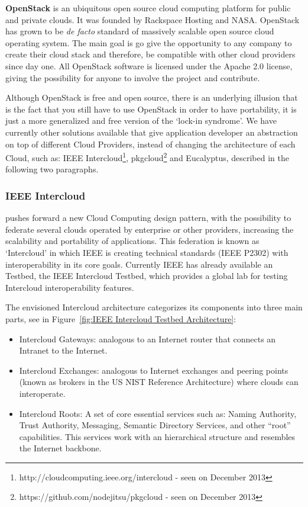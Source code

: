 \textbf{OpenStack} is an ubiquitous open source cloud computing platform for public and private clouds. It was founded by Rackspace Hosting and NASA. OpenStack has grown to be \textit{de facto} standard of massively scalable open source cloud operating system. The main goal is go give the opportunity to any company to create their cloud stack and therefore, be compatible with other cloud providers since day one. All OpenStack software is licensed under the Apache 2.0 license, giving the possibility for anyone to involve the project and contribute. 

Although OpenStack is free and open source, there is an underlying illusion that is the fact that you still have to use OpenStack in order to have portability, it is just a more generalized and free version of the `lock-in syndrome'. We have currently other solutions available that give application developer an abstraction on top of different Cloud Providers, instead of changing the architecture of each Cloud, such as: IEEE Intercloud\footnote{http://cloudcomputing.ieee.org/intercloud - seen on December 2013}, pkgcloud\footnote{https://github.com/nodejitsu/pkgcloud - seen on December 2013} and Eucalyptus\cite{Nurmi2009}, described in the following two paragraphs.


\subsubsection{IEEE Intercloud}\label{par:IEEE Intercloud}

pushes forward a new Cloud Computing design pattern, with the possibility to federate several clouds operated by enterprise or other providers, increasing the scalability and portability of applications. This federation is known as `Intercloud' in which IEEE is creating technical standards (IEEE P2302) with interoperability in its core goals. Currently IEEE has already available an Testbed, the IEEE Intercloud Testbed, which provides a global lab for testing Intercloud interoperability features.

The envisioned Intercloud architecture categorizes its components into three main parts, see in Figure~\ref{fig:IEEE Intercloud Testbed Architecture}:

\begin{itemize}
    \item Intercloud Gateways: analogous to an Internet router that connects an Intranet to the Internet.
    \item Intercloud Exchanges: analogous to Internet exchanges and peering points (known as brokers in the US NIST Reference Architecture) where clouds can interoperate.
    \item Intercloud Roots: A set of core essential services such as: Naming Authority, Trust Authority, Messaging, Semantic Directory Services, and other “root” capabilities. This services work with an hierarchical structure and resembles the Internet backbone.
\end{itemize}

